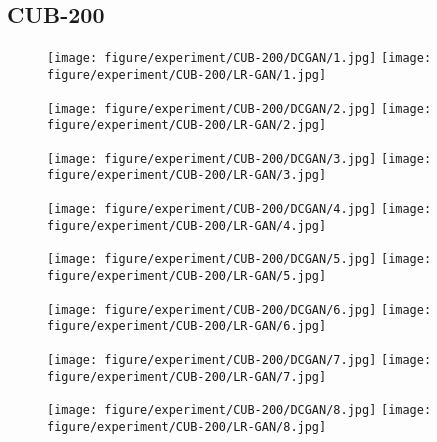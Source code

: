 \documentclass{article} \usepackage{iclr2017_conference,times}
\begin{document}
 \subsection{CUB-200}
\vspace{-5pt}
\begin{figure}[b]
\begin{minipage}{0.12\linewidth}
\texttt{[image: figure/experiment/CUB-200/DCGAN/1.jpg]}
\texttt{[image: figure/experiment/CUB-200/LR-GAN/1.jpg]}
\vspace{0.05cm}
\end{minipage}
\begin{minipage}{0.12\linewidth}
\texttt{[image: figure/experiment/CUB-200/DCGAN/2.jpg]}
\texttt{[image: figure/experiment/CUB-200/LR-GAN/2.jpg]}
\vspace{0.05cm}
\end{minipage}
\begin{minipage}{0.12\linewidth}
\texttt{[image: figure/experiment/CUB-200/DCGAN/3.jpg]}
\texttt{[image: figure/experiment/CUB-200/LR-GAN/3.jpg]}
\vspace{0.05cm}
\end{minipage}
\begin{minipage}{0.12\linewidth}
\texttt{[image: figure/experiment/CUB-200/DCGAN/4.jpg]}
\texttt{[image: figure/experiment/CUB-200/LR-GAN/4.jpg]}
\vspace{0.05cm}
\end{minipage}
\begin{minipage}{0.12\linewidth}
\texttt{[image: figure/experiment/CUB-200/DCGAN/5.jpg]}
\texttt{[image: figure/experiment/CUB-200/LR-GAN/5.jpg]}
\vspace{0.05cm}
\end{minipage}
\begin{minipage}{0.12\linewidth}
\texttt{[image: figure/experiment/CUB-200/DCGAN/6.jpg]}
\texttt{[image: figure/experiment/CUB-200/LR-GAN/6.jpg]}
\vspace{0.05cm}
\end{minipage}
\begin{minipage}{0.12\linewidth}
\texttt{[image: figure/experiment/CUB-200/DCGAN/7.jpg]}
\texttt{[image: figure/experiment/CUB-200/LR-GAN/7.jpg]}
\vspace{0.05cm}
\end{minipage}
\begin{minipage}{0.12\linewidth}
\texttt{[image: figure/experiment/CUB-200/DCGAN/8.jpg]}
\texttt{[image: figure/experiment/CUB-200/LR-GAN/8.jpg]}
\vspace{0.05cm}
\end{minipage}


\end{figure}
\end{document}
